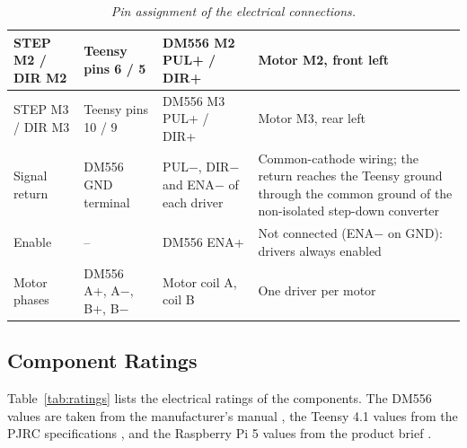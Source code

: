 \documentclass[12pt,a4paper]{report}
\begin{document}
\begin{table}[H]
\begin{tabularx}{\textwidth}{|l|>{\raggedright\arraybackslash}X|>{\raggedright\arraybackslash}X|>{\raggedright\arraybackslash}X|}
STEP M2 / DIR M2 & Teensy pins 6 / 5 & DM556 M2 PUL+ / DIR+ & Motor M2, front left \\ \hline
STEP M3 / DIR M3 & Teensy pins 10 / 9 & DM556 M3 PUL+ / DIR+ & Motor M3, rear left \\ \hline
Signal return & DM556 GND terminal & PUL$-$, DIR$-$ and ENA$-$ of each driver & Common-cathode wiring; the return reaches the Teensy ground through the common ground of the non-isolated step-down converter \\ \hline
Enable & -- & DM556 ENA+ & Not connected (ENA$-$ on GND): drivers always enabled \\ \hline
Motor phases & DM556 A+, A$-$, B+, B$-$ & Motor coil A, coil B & One driver per motor \\ \hline
\end{tabularx}
\caption{\textit{Pin assignment of the electrical connections.}}
\label{tab:pinout}
\end{table}

\subsection{Component Ratings}

Table~\ref{tab:ratings} lists the electrical ratings of the components. The DM556 values are taken from the manufacturer's manual \cite{dm556}, the Teensy 4.1 values from the PJRC specifications \cite{teensy41}, and the Raspberry Pi 5 values from the product brief \cite{rpi5}.
\end{document}
